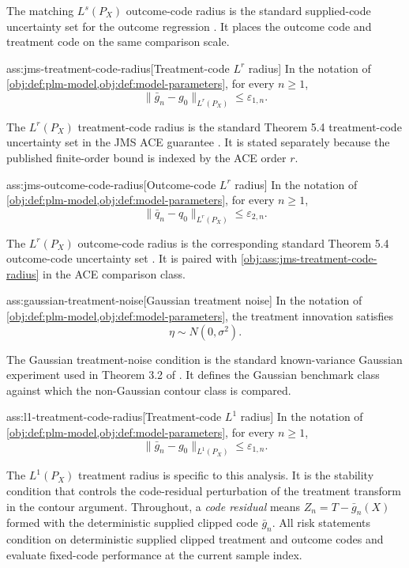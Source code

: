The matching \(L^s(P_X)\) outcome-code radius is the standard supplied-code uncertainty set for the outcome regression \citep{JinMackeySyrgkanis2025}. It places the outcome code and treatment code on the same comparison scale.

\begin{assumptionv}{ass:jms-treatment-code-radius}[Treatment-code \(L^r\) radius]
In the notation of \cref{obj:def:plm-model,obj:def:model-parameters}, for every \(n\ge 1\),
\[
\|\bar g_n-g_0\|_{L^r(P_X)}\le \varepsilon_{1,n}.
\]
\end{assumptionv}

The \(L^r(P_X)\) treatment-code radius is the standard Theorem 5.4 treatment-code uncertainty set in the JMS ACE guarantee \citep{JinMackeySyrgkanis2025}. It is stated separately because the published finite-order bound is indexed by the ACE order \(r\).

\begin{assumptionv}{ass:jms-outcome-code-radius}[Outcome-code \(L^r\) radius]
In the notation of \cref{obj:def:plm-model,obj:def:model-parameters}, for every \(n\ge 1\),
\[
\|\bar q_n-q_0\|_{L^r(P_X)}\le \varepsilon_{2,n}.
\]
\end{assumptionv}

The \(L^r(P_X)\) outcome-code radius is the corresponding standard Theorem 5.4 outcome-code uncertainty set \citep{JinMackeySyrgkanis2025}. It is paired with \cref{obj:ass:jms-treatment-code-radius} in the ACE comparison class.

\begin{assumptionv}{ass:gaussian-treatment-noise}[Gaussian treatment noise]
In the notation of \cref{obj:def:plm-model,obj:def:model-parameters}, the treatment innovation satisfies
\[
\eta\sim N(0,\sigma^2).
\]
\end{assumptionv}

The Gaussian treatment-noise condition is the standard known-variance Gaussian experiment used in Theorem 3.2 of \citet{JinMackeySyrgkanis2025}. It defines the Gaussian benchmark class against which the non-Gaussian contour class is compared.

\begin{assumptionv}{ass:l1-treatment-code-radius}[Treatment-code \(L^1\) radius]
In the notation of \cref{obj:def:plm-model,obj:def:model-parameters}, for every \(n\ge 1\),
\[
\|\bar g_n-g_0\|_{L^1(P_X)}\le \varepsilon_{1,n}.
\]
\end{assumptionv}

The \(L^1(P_X)\) treatment radius is specific to this analysis. It is the stability condition that controls the code-residual perturbation of the treatment transform in the contour argument. Throughout, a \emph{code residual} means \(Z_n=T-\bar g_n(X)\) formed with the deterministic supplied clipped code \(\bar g_n\). All risk statements condition on deterministic supplied clipped treatment and outcome codes and evaluate fixed-code performance at the current sample index.

